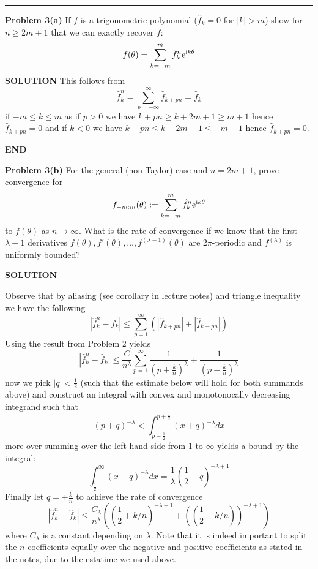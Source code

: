 \documentclass[12pt,a4paper]{article}
\begin{document}
\rule{\textwidth}{1pt}
\textbf{Problem 3(a)} If $f$ is a trigonometric polynomial  ($\hat f_k = 0$ for $|k| > m$) show for $n \ensuremath{\geq} 2m+1$ that we can exactly recover $f$:
\[
f(\ensuremath{\theta}) = \ensuremath{\sum}_{k=-m}^m \hat f_k^n {\rm e}^{{\rm i} k \ensuremath{\theta}}
\]
\textbf{SOLUTION} This follows from
\[
\hat f_k^n = \ensuremath{\sum}_{p=-\ensuremath{\infty}}^\ensuremath{\infty} \hat f_{k+pn} = \hat f_k
\]
if $-m \ensuremath{\leq} k \ensuremath{\leq} m$ as if $p > 0$ we have $k + p n \ensuremath{\geq} k + 2m+1 \ensuremath{\geq} m+1$ hence $\hat f_{k+pn} = 0$ and if $k < 0$ we have $k - pn \ensuremath{\leq} k -2m-1 \ensuremath{\leq} -m-1$ hence $\hat f_{k+pn} = 0$.

\textbf{END}

\textbf{Problem 3(b)} For the general (non-Taylor) case and $n = 2m+1$, prove convergence for
\[
f_{-m:m}(\ensuremath{\theta}) := \ensuremath{\sum}_{k=-m}^m \hat f_k^n {\rm e}^{{\rm i} k \ensuremath{\theta}}
\]
to $f(\ensuremath{\theta})$ as $n \ensuremath{\rightarrow} \ensuremath{\infty}$. What is the rate of convergence if we know that the first $\ensuremath{\lambda}-1$ derivatives $f(\ensuremath{\theta}), f'(\ensuremath{\theta}), \ensuremath{\ldots}, f^{(\ensuremath{\lambda}-1)}(\ensuremath{\theta})$ are 2\ensuremath{\pi}-periodic and $f^{(\ensuremath{\lambda})}$ is uniformly bounded?

\textbf{SOLUTION}

Observe that by aliasing (see corollary in lecture notes) and triangle inequality we have the following
\[
|\hat f_k^n - \hat f_k|  \ensuremath{\leq} \ensuremath{\sum}_{p=1}^{\ensuremath{\infty}} (|\hat f_{k+pn}|+|\hat f_{k-pn}|)
\]
Using the result from Problem 2 yields
\[
|\hat f_k^n - \hat f_k| \ensuremath{\leq} \frac{C}{n^\ensuremath{\lambda}} \ensuremath{\sum}_{p=1}^{\ensuremath{\infty}} \frac{1}{\left(p + \frac{k}{n}\right)^\ensuremath{\lambda}} + \frac{1}{\left(p - \frac{k}{n}\right)^\ensuremath{\lambda}}
\]
now we pick $|q| < \frac{1}{2}$ (such that the estimate below will hold for both summands above) and construct an integral with convex and monotonocally decreasing integrand such that
\[
\left( p + q \right)^{-\ensuremath{\lambda}} < \int_{p-\frac{1}{2}}^{p+\frac{1}{2}} (x + q)^{-\ensuremath{\lambda}} dx
\]
more over summing over the left-hand side from $1$ to $\ensuremath{\infty}$ yields a bound by the integral:
\[
\int^{\ensuremath{\infty}}_{\frac{1}{2}} (x + q)^{-\ensuremath{\lambda}} dx = \frac{1}{\ensuremath{\lambda}}(\frac{1}{2} + q)^{- \ensuremath{\lambda} + 1}
\]
Finally let $q = \pm \frac{k}{n}$ to achieve the rate of convergence
\[
|\hat f_k^n - \hat f_k| \ensuremath{\leq} \frac{C_{\ensuremath{\lambda}}}{ n^{\ensuremath{\lambda}}} \left(  \left( \frac{1}{2} + k/n \right)^{ - \ensuremath{\lambda} + 1} + \left( \left( \frac{1}{2} - k/n \right) \right)^{- \ensuremath{\lambda} +1} \right)
\]
where $C_{\ensuremath{\lambda}}$ is a constant depending on $\ensuremath{\lambda}$. Note that it is indeed important to split the $n$ coefficients equally over the negative and positive coefficients as stated in the notes, due to the estatime we used above.
\end{document}
